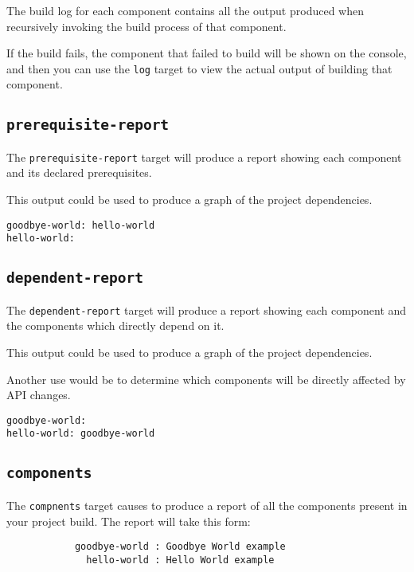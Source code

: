 The build log for each component contains all the output produced when
recursively invoking the build process of that component.

If the build fails, the component that failed to build will be shown
on the console, and then you can use the \texttt{log} target to view
the actual output of building that component.


\subsection{\texttt{prerequisite-report}}

The \texttt{prerequisite-report} target will produce a report showing
each component and its declared prerequisites.

This output could be used to produce a graph of the project dependencies.

\begin{verbatim}
goodbye-world: hello-world
hello-world:
\end{verbatim}

\subsection{\texttt{dependent-report}}

The \texttt{dependent-report} target will produce a report showing
each component and the components which directly depend on it.

This output could be used to produce a graph of the project
dependencies.

Another use would be to determine which components will be directly
affected by API changes.

\begin{verbatim}
goodbye-world:
hello-world: goodbye-world
\end{verbatim}

\subsection{\texttt{components}}\label{lmsbw:target:components}

The \texttt{compnents} target causes \lmsbw to produce a report of all
the components present in your project build.  The report will take
this form:

\begin{verbatim}
            goodbye-world : Goodbye World example
              hello-world : Hello World example
\end{verbatim}
